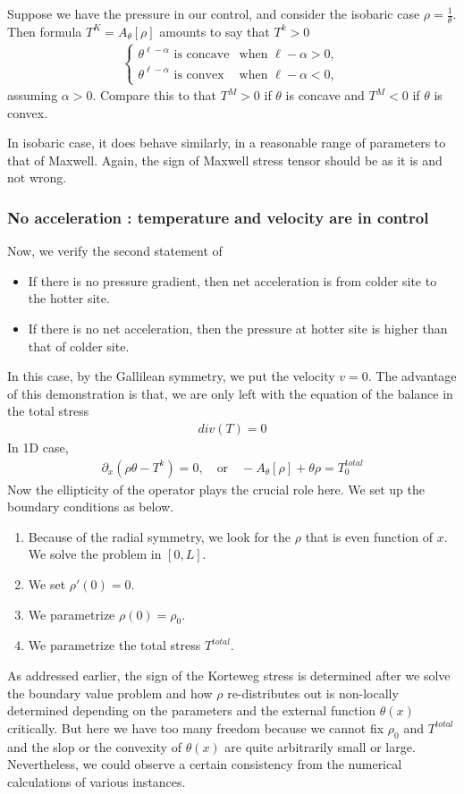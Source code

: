 \documentclass[a4paper,12pt]{article}
\begin{document}
Suppose we have the pressure in our control, and consider the isobaric case $\rho = \frac{1}{\theta}$. Then formula {{{$T^K=A_\theta[\rho]$}}} amounts to say that $T^k > 0$
\begin{align*}
 \begin{cases}
  \text{$\theta^{\ell-\alpha}$ is concave} & \text{when $\ell-\alpha>0$, }\\
  \text{$\theta^{\ell-\alpha}$ is convex}  & \text{when $\ell-\alpha<0$, }
 \end{cases}
\end{align*}
assuming $\alpha>0$.
Compare this to that $T^M >0$ if $\theta$ is concave and $T^M <0$ if $\theta$ is convex. 

In isobaric case, it does behave similarly, in a reasonable range of parameters to that of Maxwell. Again, the sign of Maxwell stress tensor should be as it is and not wrong. 

\subsubsection{No acceleration : temperature and velocity are in control}
Now, we verify the second statement of 
 \begin{itemize}
  \item If there is no pressure gradient, then net acceleration is from colder site to the hotter site.
  \item If there is no net acceleration, then the pressure at hotter site is higher than that of colder site.
 \end{itemize}
In this case, by the Gallilean symmetry, we put the velocity $v=0$. The advantage of this demonstration is that, we are only left with the equation of the balance in the total stress 
\begin{align*}
 div(T) = 0
\end{align*}
In 1D case,
\begin{align*}
 \partial_x(\rho\theta - T^k) = 0, \quad \text{or} \quad - A_\theta[\rho] + \theta\rho  = T^{total}_0
\end{align*}
Now the ellipticity of the operator plays the crucial role here. We set up the boundary conditions as below.
\begin{enumerate}
 \item Because of the radial symmetry, we look for the $\rho$ that is even function of $x$. We solve the problem in $[0,L]$.
 \item We set $\rho'(0)=0$.
 \item We parametrize $\rho(0)=\rho_0$.
 \item We parametrize the total stress $T^{total}$.
\end{enumerate}
As addressed earlier, the sign of the Korteweg stress is determined after we solve the boundary value problem and how $\rho$ re-distributes out is non-locally determined depending on the parameters and the external function $\theta(x)$ critically. But here we have too many freedom because we cannot fix $\rho_0$ and $T^{total}$ and the slop or the convexity of $\theta(x)$ are quite arbitrarily small or large. Nevertheless, we could observe a certain consistency from the numerical calculations of various instances.
\end{document}
